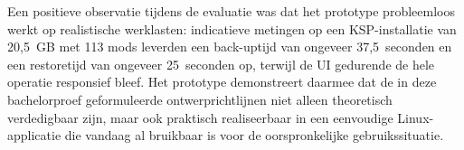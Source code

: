 Een positieve observatie tijdens de evaluatie was dat het prototype probleemloos werkt op realistische werklasten: indicatieve metingen op een KSP-installatie van 20{,}5~GB met 113 mods leverden een back-uptijd van ongeveer 37{,}5~seconden en een restoretijd van ongeveer 25~seconden op, terwijl de UI gedurende de hele operatie responsief bleef. Het prototype demonstreert daarmee dat de in deze bachelorproef geformuleerde ontwerprichtlijnen niet alleen theoretisch verdedigbaar zijn, maar ook praktisch realiseerbaar in een eenvoudige Linux-applicatie die vandaag al bruikbaar is voor de oorspronkelijke gebruikssituatie.